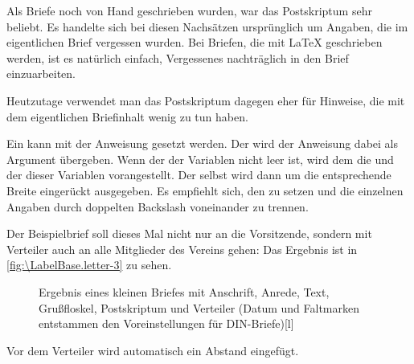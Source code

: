 \begin{Explain}%
  Als Briefe noch von Hand geschrieben wurden, war das Postskriptum
  sehr beliebt. Es handelte sich bei diesen Nachsätzen ursprünglich um
  Angaben, die im eigentlichen Brief vergessen wurden. Bei Briefen,
  die mit \LaTeX{} geschrieben werden, ist es natürlich einfach,
  Vergessenes nachträglich in den Brief einzuarbeiten. %
\iffalse %
  Trotzdem ist das Postskriptum noch immer sehr beliebt, kann man damit doch
  sehr schön noch einmal auf ganz andere äußerst wichtige oder eigentlich
  ganz unwichtige Dinge hinweisen.%
\fi
\iftrue %
  Heutzutage verwendet man das Postskriptum dagegen eher für
  Hinweise, die mit dem eigentlichen Briefinhalt wenig zu tun haben.
\fi
\end{Explain}
%
\EndIndexGroup


\begin{Declaration}
\end{Declaration}
Ein  kann mit der Anweisung 
gesetzt werden. Der  wird der Anweisung dabei als Argument
übergeben. Wenn der  der Variablen
 nicht leer ist, wird dem
 die  und der  dieser
Variablen vorangestellt. Der  selbst wird dann um die
entsprechende Breite eingerückt ausgegeben. Es empfiehlt
sich, den   zu
setzen und die einzelnen Angaben durch doppelten Backslash voneinander zu
trennen.
\begin{Example}
  Der Beispielbrief soll dieses Mal nicht nur an die Vorsitzende, sondern mit
  Verteiler auch an alle Mitglieder des Vereins gehen:
  Das Ergebnis ist in \autoref{fig:\LabelBase.letter-3} zu sehen.
  \begin{figure}
    \setcapindent{0pt}%
    \begin{captionbeside}{Ergebnis eines
        kleinen Briefes mit Anschrift, Anrede, Text, Grußfloskel, Postskriptum
        und Verteiler (Datum und Faltmarken entstammen den Voreinstellungen
        für DIN-Briefe)}[l]
    \end{captionbeside}
    \label{fig:\LabelBase.letter-3}
  \end{figure}
\end{Example}
Vor dem Verteiler wird automatisch ein Abstand eingefügt.%
%
\EndIndexGroup


